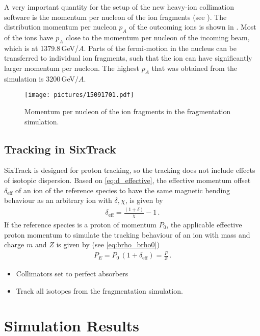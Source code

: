 A very important quantity for the setup of the new heavy-ion collimation software is the momentum per nucleon of the ion fragments (see ). The distribution momentum per nucleon $p_A$ of the outcoming ions is shown in . Most of the ions have $p_A$ close to the momentum per nucleon of the incoming \lead beam, which is at 1379.8$\,$GeV/$A$. Parts of the fermi-motion in the nucleus can be transferred to individual ion fragments, such that the ion can have significantly larger momentum per nucleon. The highest $p_A$ that was obtained from the simulation is 3200$\,$GeV$/A$.

  \begin{figure}[t]
  \centering
  \texttt{[image: pictures/15091701.pdf]}
  \caption{Momentum per nucleon of the ion fragments in the fragmentation simulation. }  
  \label{pic:15091701}
  \end{figure}


\subsection{Tracking in SixTrack}

SixTrack is designed for proton tracking, so the tracking does not include effects of isotopic dispersion. Based on \eqref{eq:d_effective}, the effective momentum offset $\delta_\text{eff}$ of an ion of the reference species to have the same magnetic bending behaviour as an arbitrary ion with $\delta,\chi$, is given by
%
\begin{align}
\delta_\text{eff} = \frac{(1+\delta)}{\chi} -1 \,. 
\end{align}
%
If the reference species is a proton of momentum $P_0$, the applicable effective proton momentum to simulate the tracking behaviour of an ion with mass and charge $m$ and $Z$ is given by (see \eqref{eq:brho_brho0})
\begin{align}
  P_E = P_0 \, (1+\delta_\text{eff}) = \frac{P}{Z} \, .
\end{align}

\begin{itemize}
\item Collimators set to perfect absorbers
\item Track all isotopes from the fragmentation simulation.
\end{itemize}


\section{Simulation Results}
